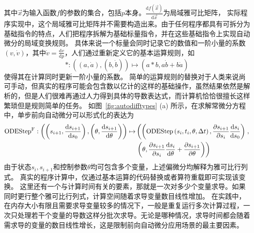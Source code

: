 \documentclass[A4,twoside,fontset=ubuntu,UTF8]{ctexart}
\def\D{\mathrm{d}}
\begin{document}
其中$\vec x$为输入函数$f$的参数的集合，包括$p$本身。$\frac{\D f(\vec x)}{\D \vec x}$为局域雅可比矩阵，
实际程序实现中，这个局域雅可比矩阵并不需要构造出来。由于任何程序都具有可拆分为基础指令的特点，人们把程序拆解为基础标量指令，并在这些基础指令上实现自动微分的局域变换规则。
具体来说一个标量会同时记录它的数值和一阶小量的系数$(v, \dot v)$，其中$\dot v = \frac{\D v}{\D p}$，人们通过重新定义它的基本运算规则，如
$$\texttt{*}: ((a, \dot a), (b, \dot b)) \mapsto (a * b, a \dot b + b \dot a)$$
使得其在计算同时更新一阶小量的系数。
简单的运算规则的替换对于人类来说尚可手动，但真实的程序可能会包含数以亿计的这样的基础操作，虽然结果依然是解析的，但是人们很难再通过人力得到具体的导数表达式，而计算机恰恰很擅长这样繁琐但是规则简单的任务。
如图~\ref{fig:autodifftypes} (a) 所示，在求解常微分方程中，单步前向自动微分可以形式化的表达为
\begin{align*}
    {\rm ODEStep}^{\rm F} : \left(\left(s_{i+1}, \frac{\D s_{i+1}}{\D s_0}\right), \left(\theta, \frac{\D s_{i+1}}{\D \theta}\right)\right)
        \mapsto &\left(\left({\rm ODEStep}\left(s_{i}, t_i, \theta, \Delta t \right), \frac{\partial s_{i+1}}{\partial s_i} \frac{\D s_{i}}{\D s_0}\right)\right., \\
        &\left.\left(\theta, \frac{\partial s_{i+1}}{\partial s_i} \frac{\D s_{i}}{\D \theta} + \frac{\partial s_{i+1}}{\partial \theta}\right)\right)
\end{align*}
由于状态$s_i, s_{i+1}$和控制参数$\theta$均可包含多个变量，上述偏微分均解释为雅可比行列式。
真实的程序计算中，仅通过基本运算的代码替换或者算符重载即可实现该变换。
这里还有一个与计算时间有关的要素，那就是一次对多少个变量求导。如果同时更行整个雅可比行列式，计算空间随着求导变量数目线性增加。
在实践中，在内存大小有限且需要求导变量较多的情况下，一般是重复运行多次计算过程，一次只处理若干个变量的导数这样分批次求导。无论是哪种情况，求导时间都会随着需求导的变量的数目线性增长，这是限制前向自动微分应用场景的最主要因素。
\end{document}
